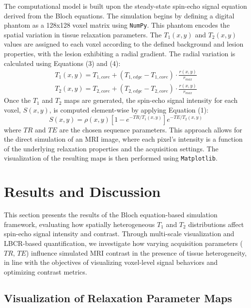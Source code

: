 \documentclass[10pt,a4paper,twoside]{article}
\begin{document}
The computational model is built upon the steady-state spin-echo signal equation derived from the Bloch equations. The simulation begins by defining a digital phantom as a 128x128 voxel matrix using \texttt{NumPy}. This phantom encodes the spatial variation in tissue relaxation parameters. The \(T_1(x,y)\) and \(T_2(x,y)\) values are assigned to each voxel according to the defined background and lesion properties, with the lesion exhibiting a radial gradient. The radial variation is calculated using Equations (3) and (4):
\begin{gather*}
T_{1}(x,y)=T_{1,core}+(T_{1,edge}-T_{1,core})\cdot\frac{r(x,y)}{r_{max}} \tag{(3)}
\end{gather*}
\begin{gather*}
T_{2}(x,y)=T_{2,core}+(T_{2,edge}-T_{2,core})\cdot\frac{r(x,y)}{r_{max}} \tag{(4)}
\end{gather*}
Once the \(T_1\) and \(T_2\) maps are generated, the spin-echo signal intensity for each voxel, \(S(x,y)\), is computed element-wise by applying Equation (1):
$$S(x, y) = \rho(x, y) \left[ 1 - e^{-TR / T_1(x, y)} \right] e^{-TE / T_2(x, y)}$$ 
where \(TR\) and \(TE\) are the chosen sequence parameters. This approach allows for the direct simulation of an MRI image, where each pixel's intensity is a function of the underlying relaxation properties and the acquisition settings. The visualization of the resulting maps is then performed using \texttt{Matplotlib}.

\section{Results and Discussion}\label{sec:rnd}

This section presents the results of the Bloch equation-based simulation framework, evaluating how spatially heterogeneous \( T_1 \) and \( T_2 \) distributions affect spin-echo signal intensity and contrast. Through multi-scale visualization and LBCR-based quantification, we investigate how varying acquisition parameters (\( TR \), \( TE \)) influence simulated MRI contrast in the presence of tissue heterogeneity, in line with the objectives of visualizing voxel-level signal behaviors and optimizing contrast metrics.

\subsection{Visualization of Relaxation Parameter Maps}
\end{document}
